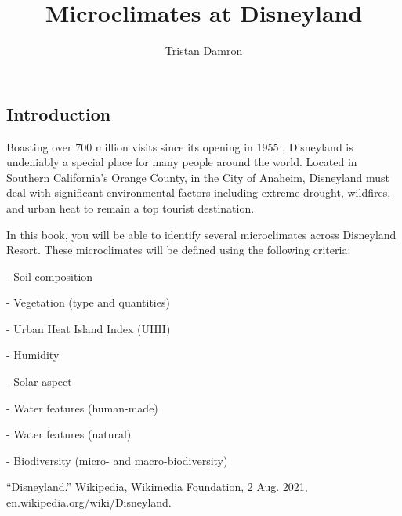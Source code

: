 \documentclass[11pt]{book}
\title{\textbf{Microclimates at Disneyland}}
\author{Tristan Damron}
\date{}
\begin{document}
\chapter{}

\section{Introduction}

Boasting over 700 million visits since its opening in 1955 \cite{disneyland}, Disneyland is undeniably a special place for many people around the world. Located in Southern California's Orange County, in the City of Anaheim, Disneyland must deal with significant environmental factors including extreme drought, wildfires, and urban heat to remain a top tourist destination.

In this book, you will be able to identify several microclimates across Disneyland Resort. These microclimates will be defined using the following criteria:

- Soil composition

- Vegetation (type and quantities)

- Urban Heat Island Index (UHII)

- Humidity

- Solar aspect
 
- Water features (human-made)

- Water features (natural)
 
- Biodiversity (micro- and macro-biodiversity)

\begin{thebibliography}{}

“Disneyland.” Wikipedia, Wikimedia Foundation, 2 Aug. 2021, en.wikipedia.org/wiki/Disneyland. 
\end{thebibliography}
\end{document}
